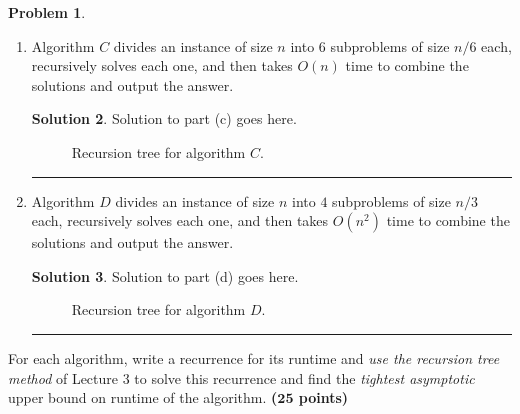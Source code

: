 \documentclass{article}
\theoremstyle{definition}
\newtheorem{problem}{Problem}
\def\fline{\rule{0.75\linewidth}{0.5pt}}
\newcommand{\finishline}{\begin{center}\fline\end{center}}
\newtheorem*{solution*}{Solution}
\newenvironment{solution}{\begin{solution*}}{{\finishline} \end{solution*}}
\newcommand{\grade}[1]{\hfill{\textbf{($\mathbf{#1}$ points)}}}
\begin{document}
\begin{problem}
\begin{enumerate}[label=(\Alph*)]
\begin{solution}
			\begin{figure}[h!]
			\centering
		\caption{Recursion tree for algorithm $B$.} 
		\end{figure}
		
\end{solution}

		\item Algorithm $C$ divides an instance of size $n$ into $6$ subproblems of size $n/6$ each, recursively solves each one, and then takes $O(n)$ time 
		to combine the solutions and output the answer.
		
		    \begin{solution}
	Solution to part (c) goes here. %
	
			\begin{figure}[h!]
			\centering
		\caption{Recursion tree for algorithm $C$.} 
		\end{figure}
\end{solution}

		\item Algorithm $D$ divides an instance of size $n$ into $4$ subproblems of size $n/3$ each, recursively solves each one, and then takes $O(n^2)$ time 
		to combine the solutions and output the answer. 
		
	    \begin{solution}
	Solution to part (d) goes here. %
	
			\begin{figure}[h!]
			\centering
		\caption{Recursion tree for algorithm $D$.} 
		\end{figure}
\end{solution}

	\end{enumerate}
	
	For each algorithm, write a recurrence for its runtime and \emph{use the recursion tree method} of Lecture 3 to solve this recurrence and find the \emph{tightest asymptotic} upper bound on runtime of the algorithm. \grade{25} 
\end{problem}

\smallskip
\end{document}
